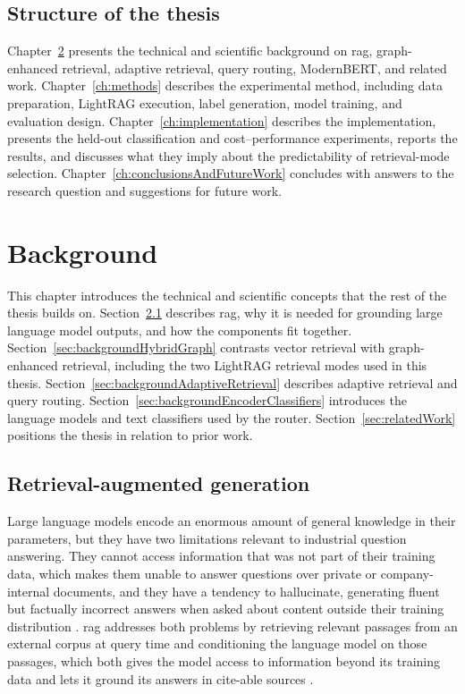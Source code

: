 \documentclass[english, bibtex]{kththesis}               %
\numberwithin{listing}{chapter}
\begin{document}
\section{Structure of the thesis}
\label{sec:structure}

Chapter~\ref{ch:background} presents the technical and scientific background on \gls{rag}, graph-enhanced retrieval, adaptive retrieval, query routing, ModernBERT, and related work. Chapter~\ref{ch:methods} describes the experimental method, including data preparation, LightRAG execution, label generation, model training, and evaluation design. Chapter~\ref{ch:implementation} describes the implementation, presents the held-out classification and cost--performance experiments, reports the results, and discusses what they imply about the predictability of retrieval-mode selection. Chapter~\ref{ch:conclusionsAndFutureWork} concludes with answers to the research question and suggestions for future work.

\cleardoublepage
\chapter{Background}
\label{ch:background}

This chapter introduces the technical and scientific concepts that the rest of the thesis builds on. Section~\ref{sec:backgroundRag} describes \gls{rag}, why it is needed for grounding large language model outputs, and how the components fit together. Section~\ref{sec:backgroundHybridGraph} contrasts vector retrieval with graph-enhanced retrieval, including the two LightRAG retrieval modes used in this thesis. Section~\ref{sec:backgroundAdaptiveRetrieval} describes adaptive retrieval and query routing. Section~\ref{sec:backgroundEncoderClassifiers} introduces the language models and text classifiers used by the router. Section~\ref{sec:relatedWork} positions the thesis in relation to prior work.

\section{Retrieval-augmented generation}
\label{sec:backgroundRag}

Large language models encode an enormous amount of general knowledge in their parameters, but they have two limitations relevant to industrial question answering. They cannot access information that was not part of their training data, which makes them unable to answer questions over private or company-internal documents, and they have a tendency to hallucinate, generating fluent but factually incorrect answers when asked about content outside their training distribution \cite{gao2023ragsurvey}. \Gls{rag} addresses both problems by retrieving relevant passages from an external corpus at query time and conditioning the language model on those passages, which both gives the model access to information beyond its training data and lets it ground its answers in cite-able sources \cite{lewis2020rag,gao2023ragsurvey}.
\end{document}
